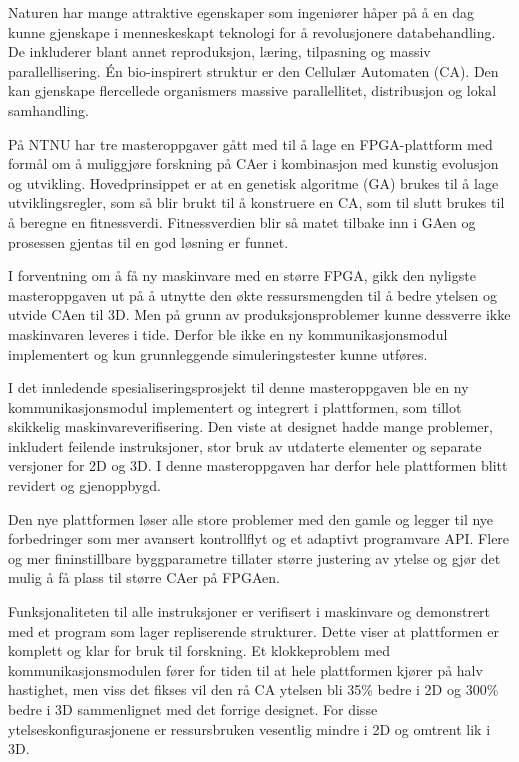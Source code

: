 Naturen har mange attraktive egenskaper som ingeniører håper på å en dag kunne gjenskape i menneskeskapt teknologi for å revolusjonere databehandling.
De inkluderer blant annet reproduksjon, læring, tilpasning og massiv parallellisering.
Én bio-inspirert struktur er den Cellulær Automaten (CA).
Den kan gjenskape flercellede organismers massive parallellitet, distribusjon og lokal samhandling.

På NTNU har tre masteroppgaver gått med til å lage en FPGA-plattform med formål om å muliggjøre forskning på CAer i kombinasjon med kunstig evolusjon og utvikling.
Hovedprinsippet er at en genetisk algoritme (GA) brukes til å lage utviklingsregler, som så blir brukt til å konstruere en CA, som til slutt brukes til å beregne en fitnessverdi.
Fitnessverdien blir så matet tilbake inn i GAen og prosessen gjentas til en god løsning er funnet.

I forventning om å få ny maskinvare med en større FPGA, gikk den nyligste masteroppgaven ut på å utnytte den økte ressursmengden til å bedre ytelsen og utvide CAen til 3D.
Men på grunn av produksjonsproblemer kunne dessverre ikke maskinvaren leveres i tide.
Derfor ble ikke en ny kommunikasjonsmodul implementert og kun grunnleggende simuleringstester kunne utføres.

I det innledende spesialiseringsprosjekt til denne masteroppgaven ble en ny kommunikasjonsmodul implementert og integrert i plattformen, som tillot skikkelig maskinvareverifisering.
Den viste at designet hadde mange problemer, inkludert feilende instruksjoner, stor bruk av utdaterte elementer og separate versjoner for 2D og 3D.
I denne masteroppgaven har derfor hele plattformen blitt revidert og gjenoppbygd.

Den nye plattformen løser alle store problemer med den gamle og legger til nye forbedringer som mer avansert kontrollflyt og et adaptivt programvare API.
Flere og mer fininstillbare byggparametre tillater større justering av ytelse og gjør det mulig å få plass til større CAer på FPGAen.

Funksjonaliteten til alle instruksjoner er verifisert i maskinvare og demonstrert med et program som lager repliserende strukturer.
Dette viser at plattformen er komplett og klar for bruk til forskning.
Et klokkeproblem med kommunikasjonsmodulen fører for tiden til at hele plattformen kjører på halv hastighet, men viss det fikses vil den rå CA ytelsen bli 35\% bedre i 2D og 300\% bedre i 3D sammenlignet med det forrige designet.
For disse ytelseskonfigurasjonene er ressursbruken vesentlig mindre i 2D og omtrent lik i 3D.
